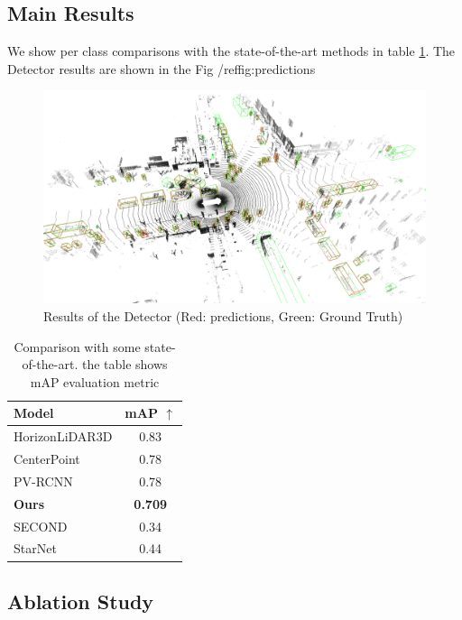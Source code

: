 \documentclass[10pt,twocolumn,letterpaper]{article}
\begin{document}
\subsection{Main Results}
We show per class comparisons with the state-of-the-art methods in table \ref{tab:waymo_det_sota}. The Detector results are shown in the Fig /ref{fig:predictions}

\begin{figure}
	\includegraphics[width=\linewidth]{media/predictions.png}
   \caption{Results of the Detector (Red: predictions, Green: Ground Truth)}
\label{fig:predictions}
\end{figure}

\begin{table}
\begin{center}
\begin{tabular}{|l c|}
\hline
Model & mAP $\uparrow$  \\
\hline\hline
HorizonLiDAR3D \cite{wang20201st}  & 0.83 \\ 
CenterPoint \cite{yin2020center}  & 0.78\\
PV-RCNN \cite{shi2020pv} & 0.78  \\
\textbf{Ours} & \textbf{0.709}  \\
SECOND \cite{yan2018second} & 0.34  \\
StarNet \cite{ngiam2019starnet} & 0.44  \\

\hline
\end{tabular}
\end{center}
\caption{Comparison with some state-of-the-art. the table shows mAP evaluation metric}
\label{tab:waymo_det_sota}
\end{table}


\subsection{Ablation Study}
\end{document}
